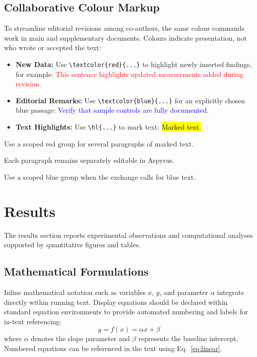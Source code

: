 \documentclass[letterpaper,11pt]{article}
\begin{document}
\subsection{Collaborative Colour Markup}
To streamline editorial revisions among co-authors, the same colour commands work in main and supplementary documents. Colours indicate presentation, not who wrote or accepted the text:
\begin{itemize}
  \item \textbf{New Data:} Use \verb|\textcolor{red}{...}| to highlight newly inserted findings, for example: \textcolor{red}{This sentence highlights updated measurements added during revision.}
  \item \textbf{Editorial Remarks:} Use \verb|\textcolor{blue}{...}| for an explicitly chosen blue passage: \textcolor{blue}{Verify that sample controls are fully documented.}
  \item \textbf{Text Highlights:} Use \verb|\hl{...}| to mark text: \hl{Marked text.}
\end{itemize}

\begingroup\color{red}
Use a scoped red group for several paragraphs of marked text.

Each paragraph remains separately editable in Aspyrus.
\endgroup

\begingroup\color{blue}
Use a scoped blue group when the exchange calls for blue text.
\endgroup


\section{Results}

The results section reports experimental observations and computational analyses supported by quantitative figures and tables.

\subsection{Mathematical Formulations}
Inline mathematical notation such as variables $x$, $y$, and parameter $\alpha$ integrate directly within running text. Display equations should be declared within standard equation environments to provide automated numbering and labels for in-text referencing:
\begin{equation}\label{eq:linear}
y = f(x) = \alpha x + \beta
\end{equation}
where $\alpha$ denotes the slope parameter and $\beta$ represents the baseline intercept. Numbered equations can be referenced in the text using Eq.~\eqref{eq:linear}.
\end{document}

